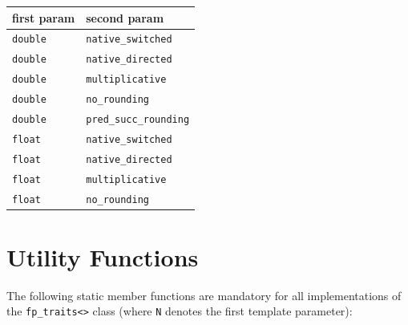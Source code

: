 \documentclass{report}
\begin{document}
	\begin{center}
	\begin{tabular}{|l|l|}
	\hline
	first param&second param\\
	\hline\hline
	\texttt{double}&\texttt{native\_switched}\\
	\hline
	\texttt{double}&\texttt{native\_directed}\\
	\hline
	\texttt{double}&\texttt{multiplicative}\\
	\hline
	\texttt{double}&\texttt{no\_rounding}\\
	\hline
	\texttt{double}&\texttt{pred\_succ\_rounding}\\
	\hline
	\texttt{float}&\texttt{native\_switched}\\
	\hline
	\texttt{float}&\texttt{native\_directed}\\
	\hline
	\texttt{float}&\texttt{multiplicative}\\
	\hline
	\texttt{float}&\texttt{no\_rounding}\\
	\hline
	\end{tabular}
	\end{center}
\section{Utility Functions}
	The following static member functions are mandatory
	for all implementations of the \texttt{fp\_traits<>}
	class (where \texttt{N} denotes the first template parameter):
\end{document}
